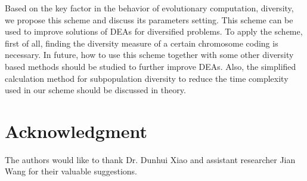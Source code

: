 \documentclass[journal,onecolumn]{IEEEtran}
\begin{document}
Based on the key factor in the behavior of evolutionary computation, diversity, we propose this scheme and discuss its parameters setting.
This scheme can be used to improve solutions of DEAs for diversified problems.
To apply the scheme, first of all, finding the diversity measure of a certain chromosome coding is necessary.
In future, how to use this scheme together with some other diversity based methods should be studied to further improve DEAs.
Also, the simplified calculation method for subpopulation diversity to reduce the time complexity used in our scheme should be discussed in theory.

\section*{Acknowledgment}
The authors would like to thank Dr. Dunhui Xiao and assistant researcher Jian Wang for their valuable suggestions.


\ifCLASSOPTIONcaptionsoff
  \newpage
\fi





%
%
%
%
\end{document}
